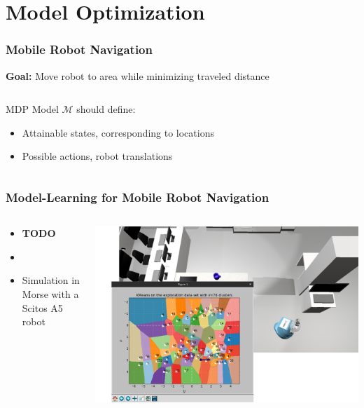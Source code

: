 \section{Model Optimization}

\begin{frame}
\frametitle{Mobile Robot Navigation}
\textcolor{tudblue}{\textbf{Goal:}} Move robot to area while minimizing traveled distance
\vfill

\begin{columns}[T]
\begin{column}{0.6\textwidth}
MDP Model $\mathcal{M}$ should define:
\begin{itemize}
	\item Attainable states, corresponding to locations
	\item Possible actions, robot translations
\end{itemize}
\end{column}

\begin{column}{0.4\textwidth}
	
\end{column}

\end{columns}

\end{frame}

\begin{frame}
\frametitle{Model-Learning for Mobile Robot Navigation}

\begin{columns}[T]
\begin{column}{0.6\textwidth}
\begin{itemize}
	\item \textbf{TODO}
	\item[] 
	\item Simulation in Morse with a Scitos A5 robot
\end{itemize}
\end{column}
\begin{column}{0.5\textwidth}
\includegraphics[width=\textwidth, left]{figures/simulation_learn_2}
\end{column}
\end{columns}	
	
\end{frame}

